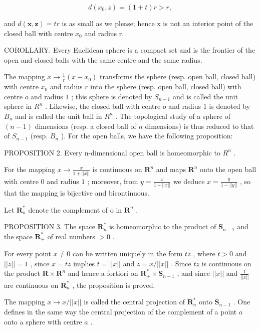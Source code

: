 \[
d (x _ {0}, z) = (1 + t) r > r,
\]

and \(d(\boldsymbol{x}, \boldsymbol{z}) = tr\) is as small as we please; hence x is not an interior point of the closed ball with centre \(x_{0}\) and radius r.

COROLLARY. Every Euclidean sphere is a compact set and is the frontier of the open and closed balls with the same centre and the same radius.

The mapping \(x \to \frac{1}{r} (x - x_0)\) transforms the sphere (resp. open ball, closed ball) with centre \(x_0\) and radius \(r\) into the sphere (resp. open ball, closed ball) with centre \(o\) and radius \(1\) ; this sphere is denoted by \(S_{n-1}\) and is called the unit sphere in \(R^n\) . Likewise, the closed ball with centre \(o\) and radius \(1\) is denoted by \(B_n\) and is called the unit ball in \(R^n\) . The topological study of a sphere of \((n - 1)\) dimensions (resp. a closed ball of \(n\) dimensions) is thus reduced to that of \(S_{n-1}\) (resp. \(B_n\) ). For the open balls, we have the following proposition:

PROPOSITION 2. Every n-dimensional open ball is homeomorphic to \(R^{n}\) .

For the mapping \(x \to \frac{x}{1 + ||x||}\) is continuous on \(\mathbf{R}^n\) and maps \(\mathbf{R}^n\) onto the open ball with centre \(0\) and radius \(1\) ; moreover, from \(y = \frac{x}{1 + ||x||}\) we deduce \(x = \frac{y}{1 - ||y||}\) , so that the mapping is bijective and bicontinuous.

Let \(\mathbf{R}_n^*\) denote the complement of o in \(\mathbf{R}^n\) .

PROPOSITION 3. The space \(\mathbf{R}_n^*\) is homeomorphic to the product of \(\mathbf{S}_{n-1}\) and the space \(\mathbf{R}_+^*\) of real numbers \(>0\) .

For every point \(x \neq 0\) can be written uniquely in the form \(tz\) , where \(t > 0\) and \(||z|| = 1\) , since \(x = tz\) implies \(t = ||x||\) and \(z = x / ||x||\) . Since \(tz\) is continuous on the product \(\mathbf{R} \times \mathbf{R}^n\) and hence a fortiori on \(\mathbf{R}_+^* \times \mathbf{S}_{n-1}\) , and since \(||x||\) and \(\frac{1}{||x||}\) are continuous on \(\mathbf{R}_n^*\) , the proposition is proved.

The mapping \(x \to x / ||x||\) is called the central projection of \(\mathbf{R}_n^*\) onto \(\mathbf{S}_{n-1}\) . One defines in the same way the central projection of the complement of a point \(a\) onto a sphere with centre \(a\) .


